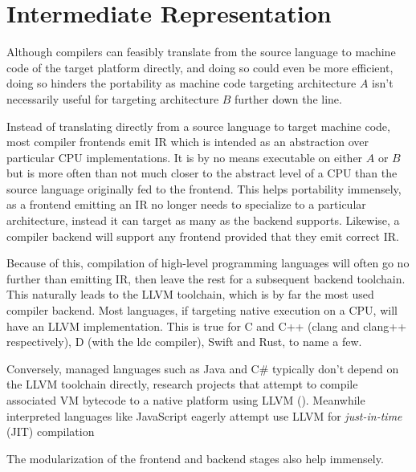 \documentclass{article}
\begin{document}


\section{Intermediate Representation}


Although compilers can feasibly translate from the source language to machine code of the target platform directly, and doing so could even be more efficient, doing so hinders the portability as machine code targeting architecture \(A\) isn't necessarily useful for targeting architecture \(B\) further down the line.

Instead of translating directly from a source language to target machine code, most compiler frontends emit IR which is intended as an abstraction over particular CPU implementations. %
It is by no means executable on either \(A\) or \(B\) but is more often than not much closer to the abstract level of a CPU than the source language originally fed to the frontend.  This helps portability immensely, as a frontend emitting an IR no longer needs to specialize to a particular architecture, instead it can target as many as the backend supports.
Likewise, a compiler backend will support any frontend provided that they emit correct IR.

Because of this, compilation of high-level programming languages will often go no further than emitting IR, then leave the rest for a subsequent backend toolchain. This naturally leads to the LLVM toolchain, which is by far the most used compiler backend. Most languages, if targeting native execution on a CPU, will have an LLVM implementation. This is true for C and C++ (clang and clang++ respectively), D (with the ldc compiler), Swift and Rust, to name a few.

Conversely, managed languages such as Java and C\# typically don't depend on the LLVM toolchain directly, research projects that attempt to compile associated VM bytecode to a native platform using LLVM (\cite{dotnet}). Meanwhile interpreted languages like JavaScript eagerly attempt use LLVM for \textit{just-in-time} (JIT) compilation %

The modularization of the frontend and backend stages also help immensely.
\end{document}

